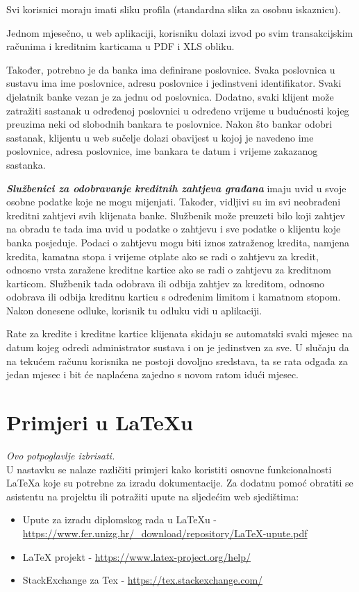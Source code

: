 		Svi korisnici moraju imati sliku profila (standardna slika za osobnu iskaznicu).
		
		Jednom mjesečno, u web aplikaciji, korisniku dolazi izvod po svim transakcijskim računima i kreditnim karticama u PDF i XLS obliku.
		
		Također, potrebno je da banka ima definirane poslovnice. Svaka poslovnica u sustavu ima ime poslovnice, adresu poslovnice i jedinstveni identifikator. Svaki djelatnik banke vezan je za jednu od poslovnica. Dodatno, svaki klijent može zatražiti sastanak u određenoj poslovnici u određeno vrijeme u budućnosti kojeg preuzima neki od slobodnih bankara te poslovnice. Nakon što bankar odobri sastanak, klijentu u web sučelje dolazi obavijest u kojoj je navedeno ime poslovnice, adresa poslovnice, ime bankara te datum i vrijeme zakazanog sastanka.
		
		\textit{\textbf{Službenici za odobravanje kreditnih zahtjeva građana}} imaju uvid u svoje osobne podatke koje ne mogu mijenjati. Također, vidljivi su im svi neobrađeni kreditni zahtjevi svih klijenata banke. Službenik može preuzeti bilo koji zahtjev na obradu te tada ima uvid u podatke o zahtjevu i sve podatke o klijentu koje banka posjeduje. Podaci o zahtjevu mogu biti iznos zatraženog kredita, namjena kredita, kamatna stopa i vrijeme otplate ako se radi o zahtjevu za kredit, odnosno vrsta zaražene kreditne kartice ako se radi o zahtjevu za kreditnom karticom. Službenik tada odobrava ili odbija zahtjev za kreditom, odnosno odobrava ili odbija kreditnu karticu s određenim limitom i kamatnom stopom.
		Nakon donesene odluke, korisnik tu odluku vidi u aplikaciji.
		
		Rate za kredite i kreditne kartice klijenata skidaju se automatski svaki mjesec na datum kojeg odredi administrator sustava i on je jedinstven za sve. U slučaju da na tekućem računu korisnika ne postoji dovoljno sredstava, ta se rata odgađa za jedan mjesec i bit će naplaćena zajedno s novom ratom idući mjesec.
		\eject
		
		\section{Primjeri u LaTeXu}
		
		\textit{Ovo potpoglavlje izbrisati.}\\

		U nastavku se nalaze različiti primjeri kako koristiti osnovne funkcionalnosti LaTeXa koje su potrebne za izradu dokumentacije. Za dodatnu pomoć obratiti se asistentu na projektu ili potražiti upute na sljedećim web sjedištima:
		\begin{itemize}
			\item Upute za izradu diplomskog rada u LaTeXu - \url{https://www.fer.unizg.hr/_download/repository/LaTeX-upute.pdf}
			\item LaTeX projekt - \url{https://www.latex-project.org/help/}
			\item StackExchange za Tex - \url{https://tex.stackexchange.com/}\\
		
		\end{itemize} 	


